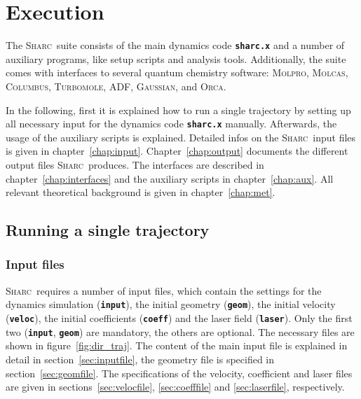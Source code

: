 \documentclass[a4paper,10pt,DIV=15,openany]{scrbook}
\newcommand{\sharc}{\textsc{Sharc}}
\newcommand{\ttt}[1]{\textbf{\texttt{#1}}}
\begin{document}

\chapter{Execution}

The \sharc\ suite consists of the main dynamics code \ttt{sharc.x} and a number of auxiliary programs, like setup scripts and analysis tools. Additionally, the suite comes with interfaces to several quantum chemistry software: \textsc{Molpro}, \textsc{Molcas}, \textsc{Columbus}, \textsc{Turbomole}, \textsc{ADF}, \textsc{Gaussian}, and \textsc{Orca}. 

In the following, first it is explained how to run a single trajectory by setting up all necessary input for the dynamics code \ttt{sharc.x} manually. Afterwards, the usage of the auxiliary scripts is explained. 
Detailed infos on the \sharc\ input files is given in chapter~\ref{chap:input}.
Chapter~\ref{chap:output} documents the different output files \sharc\ produces.
The interfaces are described in chapter~\ref{chap:interfaces} and the auxiliary scripts in chapter~\ref{chap:aux}. 
All relevant theoretical background is given in chapter~\ref{chap:met}.

\section{Running a single trajectory}

\subsection{Input files}

\sharc\ requires a number of input files, which contain the settings for the dynamics simulation (\ttt{input}), the initial geometry (\ttt{geom}), the initial velocity (\ttt{veloc}), the initial coefficients (\ttt{coeff}) and the laser field (\ttt{laser}). Only the first two (\ttt{input}, \ttt{geom}) are mandatory, the others are optional. The necessary files are shown in figure~\ref{fig:dir_traj}. 
The content of the main input file is explained in detail in section~\ref{sec:inputfile}, the geometry file is specified in section~\ref{sec:geomfile}. The specifications of the velocity, coefficient and laser files are given in sections~\ref{sec:velocfile}, \ref{sec:coefffile} and \ref{sec:laserfile}, respectively.
\end{document}

